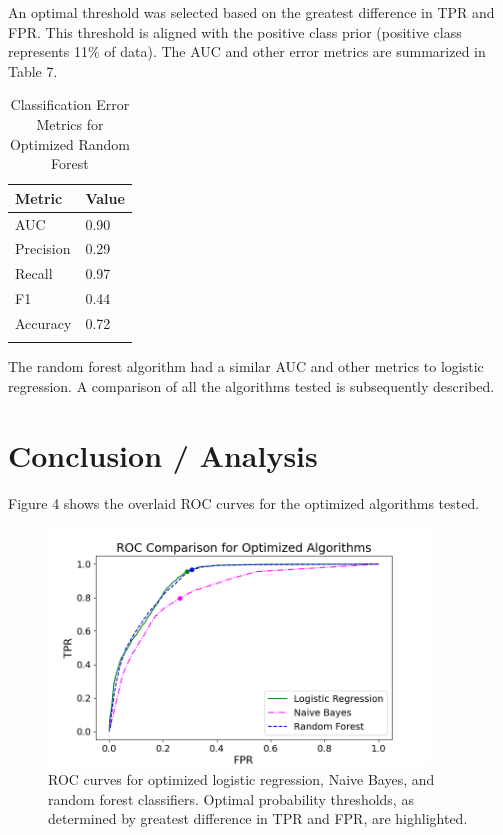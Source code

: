 \documentclass[11pt]{article}
\begin{document}
An optimal threshold was selected based on the greatest difference in TPR and FPR. This threshold is aligned with the positive class prior (positive class represents 11\% of data). The AUC and other error metrics are summarized in Table 7. 
\begin{table}[H]
\centering
\caption{Classification Error Metrics for Optimized Random Forest }
\begin{tabular}{ll}
\hline
\textbf{Metric }& \textbf{Value }\\
\hline
AUC &0.90  \\
Precision &0.29   \\
Recall &0.97  \\
F1 &0.44 \\
Accuracy &0.72 \\
\label{tB}
\end{tabular}
\end{table}

The random forest algorithm had a similar AUC and other metrics to logistic regression. A comparison of all the algorithms tested is subsequently described.


\section{Conclusion / Analysis}
\label{SS:5}

Figure 4 shows the overlaid ROC curves for the optimized algorithms tested.


\begin{figure}[hbt!]
\centering
\includegraphics[width = 0.9\textwidth]{overlayed_roc.png} 
\caption{ ROC curves for optimized logistic regression, Naive Bayes, and random forest classifiers. Optimal probability thresholds, as determined by greatest difference in TPR and FPR, are highlighted.}
\label{ROC}
\end{figure}
\end{document}
